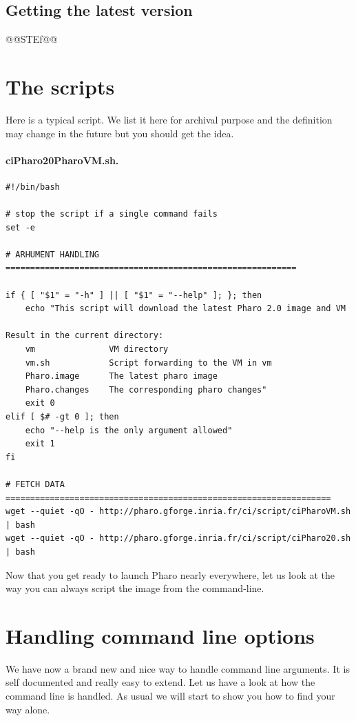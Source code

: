 \documentclass[a4paper,10pt,twoside]{book}
\begin{document}
\subsection{Getting the latest version}

@@STEf@@




\section{The scripts}
Here is a typical script. We list it here for archival purpose and the definition may change in the future
but you should get the idea.
	
\paragraph{ciPharo20PharoVM.sh.}

\begin{scriptsize}
\begin{verbatim}
#!/bin/bash

# stop the script if a single command fails
set -e 

# ARHUMENT HANDLING ===========================================================

if { [ "$1" = "-h" ] || [ "$1" = "--help" ]; }; then
    echo "This script will download the latest Pharo 2.0 image and VM

Result in the current directory:
    vm               VM directory
    vm.sh            Script forwarding to the VM in vm
    Pharo.image      The latest pharo image
    Pharo.changes    The corresponding pharo changes"
    exit 0
elif [ $# -gt 0 ]; then
    echo "--help is the only argument allowed"
    exit 1
fi

# FETCH DATA ==================================================================
wget --quiet -qO - http://pharo.gforge.inria.fr/ci/script/ciPharoVM.sh | bash
wget --quiet -qO - http://pharo.gforge.inria.fr/ci/script/ciPharo20.sh | bash
\end{verbatim}
\end{scriptsize}

Now that you get ready to launch Pharo nearly everywhere, let us look at the way you 
can always script the image from the command-line. 


\section{Handling command line options}
We have now a brand new and nice way to handle command line arguments. It is self documented and really easy to extend. Let us have a look at how the command line is handled. As usual we will start to show you how to find your way alone.
\end{document}
